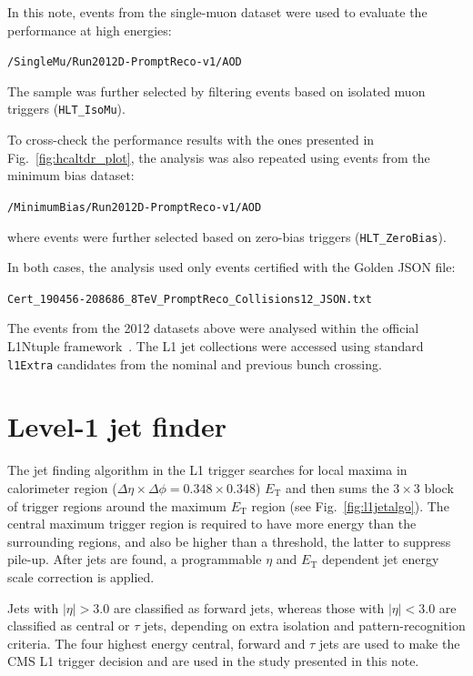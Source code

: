 \documentclass[11pt]{cmspaperpdf}
\newcommand{\et}{\ensuremath{E_{\textrm{T}}}\xspace}
\begin{document}
In this note, events from the single-muon dataset were used to evaluate the performance at high energies:

\texttt{/SingleMu/Run2012D-PromptReco-v1/AOD}

The sample was further selected by filtering events based on isolated muon triggers (\texttt{HLT\_IsoMu}).

To cross-check the performance results with the ones presented in Fig.~\ref{fig:hcaltdr_plot}, the analysis was also repeated using events from the minimum bias dataset:

\texttt{/MinimumBias/Run2012D-PromptReco-v1/AOD}

where events were further selected based on zero-bias triggers (\texttt{HLT\_ZeroBias}).

In both cases, the analysis used only events certified with the Golden JSON file:

\texttt{Cert\_190456-208686\_8TeV\_PromptReco\_Collisions12\_JSON.txt}

The events from the 2012 datasets above were analysed within the official L1Ntuple framework~\cite{l1ntpl}. The L1 jet collections were accessed using standard \texttt{l1Extra} candidates from the nominal and previous bunch crossing.

\section{Level-1 jet finder}
\label{sec:l1jetalgo}

The jet finding algorithm in the L1 trigger searches for local maxima in calorimeter region ($\Delta \eta \times \Delta \phi =
0.348 \times 0.348$) \et and then sums the $3\times3$ block of trigger regions around the maximum \et region (see
Fig.~\ref{fig:l1jetalgo}). The central maximum trigger region is required to have more energy than the surrounding
regions, and also be higher than a threshold, the latter to suppress pile-up. After jets are found, a programmable $\eta$ and \et dependent jet energy scale correction is applied.

Jets with $|\eta|>3.0$ are classified as forward jets, whereas those with $|\eta|<3.0$ are classified as central or $\tau$ jets, 
depending on extra isolation and pattern-recognition criteria. The four highest energy central, forward and $\tau$ jets are used to make the CMS L1 trigger decision and are used in the study presented in this note.
\end{document}
